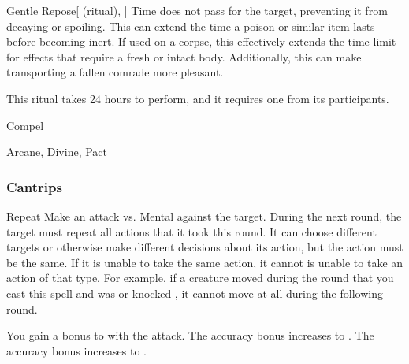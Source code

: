 \lowercase{\hypertarget{spell:Gentle Repose}{}}\label{spell:Gentle Repose}
\begin{attuneability}[Rank 3]{\hypertarget{spell:Gentle Repose}{Gentle Repose}}[ (ritual), ]
Time does not pass for the target, preventing it from decaying or spoiling.
This can extend the time a poison or similar item lasts before becoming inert.
If used on a corpse, this effectively extends the time limit for effects that require a fresh or intact body.
Additionally, this can make transporting a fallen comrade more pleasant.

This ritual takes 24 hours to perform, and it requires one  from its participants.
\end{attuneability}
\vspace{0.25em}


\newpage
\begin{spellsection}{Compel}

\begin{spellheader}
\end{spellheader}


 Arcane, Divine, Pact

\subsubsection{Cantrips}


\begin{freeability}{Repeat}
Make an attack vs. Mental against the target.
\hit During the next round, the target must repeat all actions that it took this round.
It can choose different targets or otherwise make different decisions about its action, but the action must be the same.
If it is unable to take the same action, it cannot is unable to take an action of that type.
For example, if a creature moved during the round that you cast this spell and was  or knocked , it cannot move at all during the following round.

\rankline
{} You gain a  bonus to  with the attack.
 The accuracy bonus increases to .
 The accuracy bonus increases to .
\end{freeability}

\end{spellsection}


